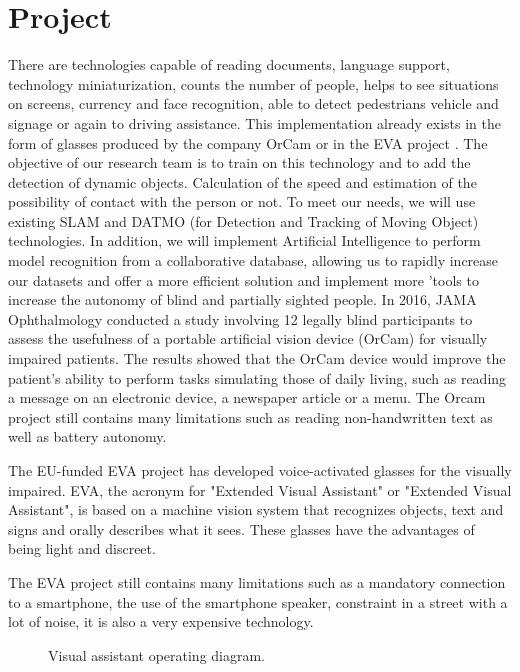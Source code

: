 \documentclass[conference,compsoc]{IEEEtran}
\begin{document}
\section{Project}
There are technologies capable of reading documents, language support, technology miniaturization, counts the number of people, helps to see situations on screens, currency and face recognition, able to detect pedestrians vehicle and signage or again to driving assistance. This implementation already exists in the form of glasses produced by the company OrCam \cite{orcam_2021} or in the EVA project \cite{eva}.
The objective of our research team is to train on this technology and to add the detection of dynamic objects. Calculation of the speed and estimation of the possibility of contact with the person or not.
To meet our needs, we will use existing SLAM and DATMO (for Detection and Tracking of Moving Object) \cite{Pancham2011-11} technologies. In addition, we will implement Artificial Intelligence to perform model recognition from a collaborative database, allowing us to rapidly increase our datasets and offer a more efficient solution and implement more 'tools to increase the autonomy of blind and partially sighted people.
In 2016, JAMA Ophthalmology \cite{adrienne_w.scott_2016} conducted a study involving 12 legally blind participants to assess the usefulness of a portable artificial vision device (OrCam) for visually impaired patients. The results showed that the OrCam \cite{orcam_2021} device would improve the patient's ability to perform tasks simulating those of daily living, such as reading a message on an electronic device, a newspaper article or a menu.
The Orcam \cite{orcam_2021} project still contains many limitations such as reading non-handwritten text as well as battery autonomy.
 
The EU-funded EVA project \cite{eva} has developed voice-activated glasses for the visually impaired. EVA, the acronym for "Extended Visual Assistant" or "Extended Visual Assistant", is based on a machine vision system that recognizes objects, text and signs and orally describes what it sees. These glasses have the advantages of being light and discreet.

The EVA project \cite{eva} still contains many limitations such as a mandatory connection to a smartphone, the use of the smartphone speaker, constraint in a street with a lot of noise, it is also a very expensive technology.

\begin{figure}[ht]
\centering
{}
\caption{Visual assistant operating diagram.}
\end{figure}
\end{document}

